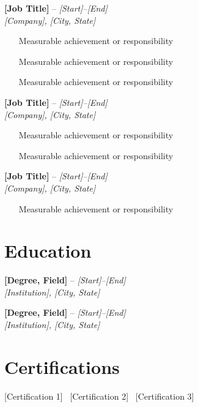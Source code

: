 \documentclass[11pt,letterpaper]{article}
\newcommand{\cvheader}[3]{%
  \noindent\textbf{#1} -- \textit{#3}\\
  \textit{#2}
}
\begin{document}
\vspace{5pt}
\cvheader{[Job Title]}{[Company], [City, State]}{[Start]--[End]}
\begin{itemize}
  \item [Measurable achievement or responsibility]
  \item [Measurable achievement or responsibility]
  \item [Measurable achievement or responsibility]
\end{itemize}

\vspace{5pt}
\cvheader{[Job Title]}{[Company], [City, State]}{[Start]--[End]}
\begin{itemize}
  \item [Measurable achievement or responsibility]
  \item [Measurable achievement or responsibility]
\end{itemize}

\vspace{5pt}
\cvheader{[Job Title]}{[Company], [City, State]}{[Start]--[End]}
\begin{itemize}
  \item [Measurable achievement or responsibility]
\end{itemize}

\section{Education}
\cvheader{[Degree, Field]}{[Institution], [City, State]}{[Start]--[End]}

\vspace{3pt}
\cvheader{[Degree, Field]}{[Institution], [City, State]}{[Start]--[End]}

\section{Certifications}
[Certification 1] \textbar\ [Certification 2] \textbar\ [Certification 3]
\end{document}
